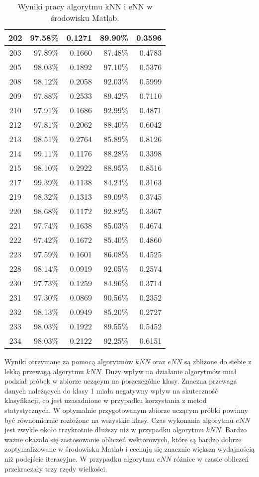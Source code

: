 \begin{table}[H]
\begin{tabular}{|c|r|r|r|r|}
\hline
202 &  97.58\% & 0.1271 &  89.90\% & 0.3596 \\ 
\hline
203 &  97.89\% & 0.1660 &  87.48\% & 0.4783 \\ 
\hline
205 &  98.03\% & 0.1892 &  97.10\% & 0.5376 \\ 
\hline
208 &  98.12\% & 0.2058 &  92.03\% & 0.5999 \\ 
\hline
209 &  97.88\% & 0.2533 &  89.42\% & 0.7110 \\ 
\hline
210 &  97.91\% & 0.1686 &  92.99\% & 0.4871 \\ 
\hline
212 &  97.81\% & 0.2062 &  88.40\% & 0.6042 \\ 
\hline
213 &  98.51\% & 0.2764 &  85.89\% & 0.8126 \\ 
\hline
214 &  99.11\% & 0.1176 &  88.28\% & 0.3398 \\ 
\hline
215 &  98.10\% & 0.2922 &  88.95\% & 0.8516 \\ 
\hline
217 &  99.39\% & 0.1138 &  84.24\% & 0.3163 \\ 
\hline
219 &  98.32\% & 0.1313 &  89.09\% & 0.3745 \\ 
\hline
220 &  98.68\% & 0.1172 &  92.82\% & 0.3367 \\ 
\hline
221 &  97.74\% & 0.1638 &  85.03\% & 0.4674 \\ 
\hline
222 &  97.42\% & 0.1672 &  85.40\% & 0.4860 \\ 
\hline
223 &  97.59\% & 0.1601 &  86.08\% & 0.4525 \\ 
\hline
228 &  98.14\% & 0.0919 &  92.05\% & 0.2574 \\ 
\hline
230 &  97.73\% & 0.1259 &  84.96\% & 0.3714 \\ 
\hline
231 &  97.30\% & 0.0869 &  90.56\% & 0.2352 \\ 
\hline
232 &  98.13\% & 0.0949 &  85.20\% & 0.2727 \\ 
\hline
233 &  98.03\% & 0.1922 &  89.55\% & 0.5452 \\ 
\hline
234 &  98.03\% & 0.2122 &  92.25\% & 0.6151 \\ 
\hline
		
	\end{tabular}
	\caption{Wyniki pracy algorytmu kNN i eNN w środowisku Matlab.}
	\label{tab:matlab-skutecznosc}
	
\end{table}

Wyniki otrzymane za pomocą algorytmów $kNN$ oraz $eNN$ są zbliżone do siebie z lekką przewagą algorytmu $kNN$. Duży wpływ na działanie algorytmów miał podział próbek w zbiorze uczącym na poszczególne klasy. Znaczna przewaga danych należących do klasy 1 miała negatywny wpływ na skuteczność klasyfikacji, co jest uzasadnione w przypadku korzystania z metod statystycznych. W optymalnie przygotowanym zbiorze uczącym próbki powinny być równomiernie rozłożone na wszystkie klasy. Czas wykonania algorytmu $eNN$ jest zwykle około trzykrotnie dłuższy niż w przypadku algorytmu $kNN$. Bardzo ważne okazało się zastosowanie obliczeń wektorowych, które są bardzo dobrze zoptymalizowane w środowisku Matlab i cechują się znacznie większą wydajnością niż podejście iteracyjne. W przypadku algorytmu $eNN$ różnice w czasie obliczeń przekraczały trzy rzędy wielkości.